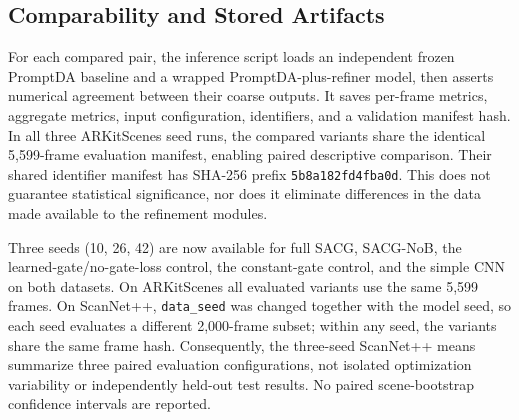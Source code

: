 \subsection{Comparability and Stored Artifacts}
For each compared pair, the inference script loads an independent frozen PromptDA baseline and a wrapped PromptDA-plus-refiner model, then asserts numerical agreement between their coarse outputs. It saves per-frame metrics, aggregate metrics, input configuration, identifiers, and a validation manifest hash. In all three ARKitScenes seed runs, the compared variants share the identical 5,599-frame evaluation manifest, enabling paired descriptive comparison. Their shared identifier manifest has SHA-256 prefix \texttt{5b8a182fd4fba0d}. This does not guarantee statistical significance, nor does it eliminate differences in the data made available to the refinement modules.

Three seeds (10, 26, 42) are now available for full SACG, SACG-NoB, the learned-gate/no-gate-loss control, the constant-gate control, and the simple CNN on both datasets. On ARKitScenes all evaluated variants use the same 5,599 frames. On ScanNet++, \texttt{data\_seed} was changed together with the model seed, so each seed evaluates a different 2,000-frame subset; within any seed, the variants share the same frame hash. Consequently, the three-seed ScanNet++ means summarize three paired evaluation configurations, not isolated optimization variability or independently held-out test results. No paired scene-bootstrap confidence intervals are reported.
